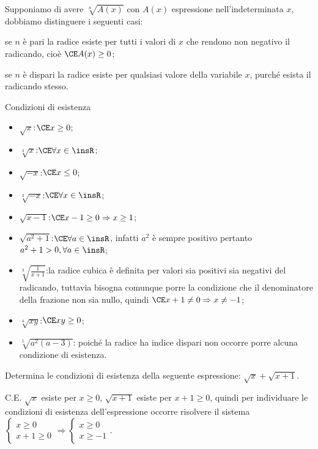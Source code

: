 Supponiamo di avere $\sqrt[n]{A(x)}$ con $A(x)$ espressione nell’indeterminata $x$, dobbiamo distinguere i seguenti casi:
\begin{itemize*}
\item se $n$ è pari la radice esiste per tutti i valori di $x$ che rendono non negativo il radicando, cioè $\CE A(x)\ge 0$;
\item se $n$ è dispari la radice esiste per qualsiasi valore della variabile $x$, purché esista il radicando stesso.
\end{itemize*}

\begin{exrig}
\begin{esempio}
Condizioni di esistenza
 \begin{itemize}
 \item $\sqrt x$:\quad $\CE x\ge 0$;
 \item $\sqrt[3]x$:\quad $\CE \forall x\in \insR$;
 \item $\sqrt{-x}$:\quad $\CE x\le 0$;
 \item $\sqrt[3]{-x}$:\quad $\CE \forall x\in \insR$;
 \item $\sqrt{x-1}$:\quad $\CE x-1\ge 0 \Rightarrow x\ge 1$;
 \item $\sqrt{a^2+1}$:\quad $\CE \forall a\in \insR$, infatti $a^2$ è sempre positivo pertanto $a^2+1>0, \forall a\in \insR$;
 \item $\sqrt[3]{\frac 1{x+1}}$:\quad la radice cubica è definita per valori sia positivi sia negativi del radicando, tuttavia bisogna comunque porre la condizione che il denominatore della frazione non sia nullo, quindi $\CE x+1\neq 0 \Rightarrow x\neq -1$;
 \item $\sqrt[4]{xy}$:\quad $\CE xy\ge 0$;
 \item $\sqrt[5]{a^2(a-3)}$: poiché la radice ha indice dispari non occorre porre alcuna condizione di esistenza.
\end{itemize}
\end{esempio}

\begin{esempio}
 Determina le condizioni di esistenza della seguente espressione: $\sqrt x+\sqrt{x+1}$.

C.E. $\sqrt x$ esiste per $x\ge 0$, $\sqrt{x+1}$ esiste per $x+1\ge 0$, quindi per individuare le condizioni di esistenza dell'espressione occorre risolvere il sistema $\left\{\begin{array}{l} x\ge0\\ x+1\ge0\end{array}\right.\Rightarrow\left\{\begin{array}{l}x\ge0\\x\ge-1\end{array}\right.$.
\begin{center}
 
\end{center}


\end{esempio}
\end{exrig}
